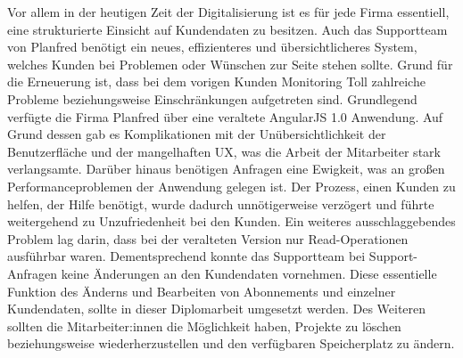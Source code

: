 Vor allem in der heutigen Zeit der Digitalisierung ist es für jede Firma essentiell, eine strukturierte Einsicht auf Kundendaten zu besitzen. Auch das Supportteam von Planfred benötigt ein neues, effizienteres und übersichtlicheres System, welches Kunden bei Problemen oder Wünschen zur Seite stehen sollte. Grund für die Erneuerung ist, dass bei dem vorigen Kunden Monitoring Toll zahlreiche Probleme beziehungsweise Einschränkungen aufgetreten sind.
\newline
Grundlegend verfügte die Firma Planfred über eine veraltete AngularJS 1.0 Anwendung. Auf Grund dessen gab es Komplikationen mit der Unübersichtlichkeit der Benutzerfläche und der mangelhaften UX, was die Arbeit der Mitarbeiter stark verlangsamte. Darüber hinaus benötigen Anfragen eine Ewigkeit, was an großen Performanceproblemen der Anwendung gelegen ist. Der Prozess, einen Kunden zu helfen, der Hilfe benötigt, wurde dadurch unnötigerweise verzögert und führte weitergehend zu Unzufriedenheit bei den Kunden.
\newline
Ein weiteres ausschlaggebendes Problem lag darin, dass bei der veralteten Version nur Read-Operationen ausführbar waren. Dementsprechend konnte das Supportteam bei Support-Anfragen keine Änderungen an den Kundendaten vornehmen. Diese essentielle Funktion des Änderns und Bearbeiten von Abonnements und einzelner Kundendaten, sollte in dieser Diplomarbeit umgesetzt werden. Des Weiteren sollten die Mitarbeiter:innen die Möglichkeit haben, Projekte zu löschen beziehungsweise wiederherzustellen und den verfügbaren Speicherplatz zu ändern.